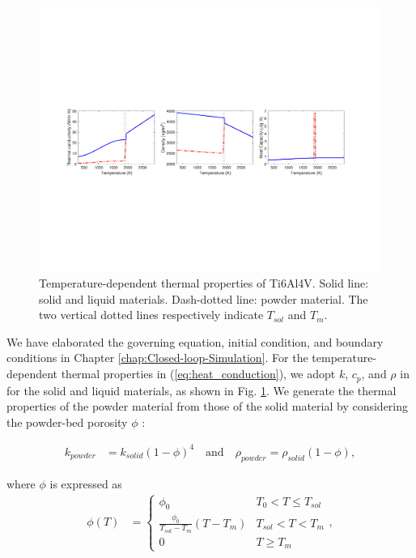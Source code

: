 \documentclass [11pt, proquest] {uwthesis}[2020/02/24]
\begin{document}
\begin{figure}[!ht]
\begin{centering}
\includegraphics[clip,width=16cm]{Closed-loop-simulation/temp_dependent_thermal_properties}
\par\end{centering}
\centering{}\caption{\label{fig:Temperature-dependent-physical-p}Temperature-dependent
thermal properties of Ti6Al4V.
Solid line: solid and liquid materials. Dash-dotted line: powder material.
The two vertical dotted lines respectively indicate $T_{sol}$ and
$T_{m}$.}
\end{figure}
We have elaborated the governing equation, initial condition, and
boundary conditions in Chapter \ref{chap:Closed-loop-Simulation}.
For the temperature-dependent thermal properties in (\ref{eq:heat_conduction}),
we adopt $k$, $c_{p}$, and $\rho$ in \cite{masoomi2017laser,arce2012thermal}
for the solid and liquid materials, as shown in Fig. \ref{fig:Temperature-dependent-physical-p}.
We generate the thermal properties of the powder material from those
of the solid material by considering the powder-bed porosity $\phi$
\cite{karayagiz2019numerical,yin2012simulation}:

\begin{align*}
k_{powder} & =k_{solid}(1-\phi)^{4}\quad\text{and}\quad\rho_{powder}=\rho_{solid}(1-\phi),
\end{align*}

\noindent where $\phi$ is expressed as
\begin{align*}
\phi(T) & =\begin{cases}
\phi_{0} & T_{0}<T\leq T_{sol}\\
\frac{\phi_{0}}{T_{sol}-T_{m}}(T-T_{m}) & T_{sol}<T<T_{m}\\
0 & T\geq T_{m}
\end{cases},
\end{align*}
\end{document}
